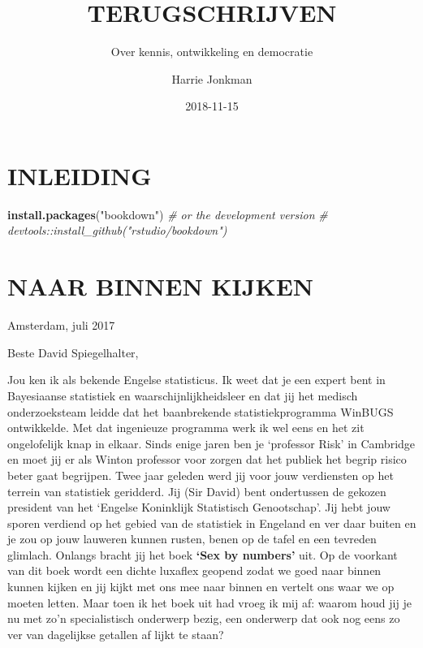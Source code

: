 \documentclass[]{book}
\title{TERUGSCHRIJVEN}
\subtitle{Over kennis, ontwikkeling en democratie}
\author{Harrie Jonkman}
\date{2018-11-15}
\newenvironment{Shaded}{\begin{snugshade}}{\end{snugshade}}
\newcommand{\CommentTok}[1]{\textcolor[rgb]{0.56,0.35,0.01}{\textit{#1}}}
\newcommand{\KeywordTok}[1]{\textcolor[rgb]{0.13,0.29,0.53}{\textbf{#1}}}
\newcommand{\NormalTok}[1]{#1}
\newcommand{\StringTok}[1]{\textcolor[rgb]{0.31,0.60,0.02}{#1}}
\begin{document}
\maketitle

{
\setcounter{tocdepth}{1}
\tableofcontents
}
\hypertarget{inleiding}{%
\chapter*{INLEIDING}\label{inleiding}}

\begin{Shaded}
\begin{Highlighting}[]
\KeywordTok{install.packages}\NormalTok{(}\StringTok{"bookdown"}\NormalTok{)}
\CommentTok{# or the development version}
\CommentTok{# devtools::install_github("rstudio/bookdown")}
\end{Highlighting}
\end{Shaded}

\hypertarget{naar-binnen-kijken}{%
\chapter*{NAAR BINNEN KIJKEN}\label{naar-binnen-kijken}}

Amsterdam, juli 2017

Beste David Spiegelhalter,

Jou ken ik als bekende Engelse statisticus. Ik weet dat je een expert
bent in Bayesiaanse statistiek en waarschijnlijkheidsleer en dat jij het
medisch onderzoeksteam leidde dat het baanbrekende statistiekprogramma
WinBUGS ontwikkelde. Met dat ingenieuze programma werk ik wel eens en
het zit ongelofelijk knap in elkaar. Sinds enige jaren ben je `professor
Risk' in Cambridge en moet jij er als Winton professor voor zorgen dat
het publiek het begrip risico beter gaat begrijpen. Twee jaar geleden
werd jij voor jouw verdiensten op het terrein van statistiek geridderd.
Jij (Sir David) bent ondertussen de gekozen president van het `Engelse
Koninklijk Statistisch Genootschap'. Jij hebt jouw sporen verdiend op
het gebied van de statistiek in Engeland en ver daar buiten en je zou op
jouw lauweren kunnen rusten, benen op de tafel en een tevreden glimlach.
Onlangs bracht jij het boek \textbf{`Sex by numbers'} uit. Op de
voorkant van dit boek wordt een dichte luxaflex geopend zodat we goed
naar binnen kunnen kijken en jij kijkt met ons mee naar binnen en
vertelt ons waar we op moeten letten. Maar toen ik het boek uit had
vroeg ik mij af: waarom houd jij je nu met zo'n specialistisch onderwerp
bezig, een onderwerp dat ook nog eens zo ver van dagelijkse getallen af
lijkt te staan?
\end{document}
